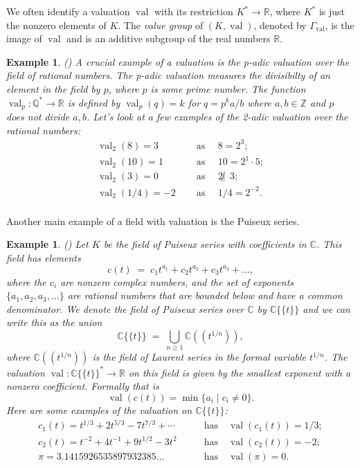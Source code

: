 \documentclass[11pt,reqno,a4paper]{article}
\theoremstyle{theoremstyle}
\theoremstyle{examplestyle}
\newtheorem{example}[theorem]{Example}
\theoremstyle{algorithmstyle}
\numberwithin{equation}{subsection}
\newcommand{\RR}{\mathbb{R}}
\newcommand{\QQ}{\mathbb{Q}}
\newcommand{\CC}{\mathbb{C}}
\newcommand{\puiseux}{\mathbb{C}\{\{t\}\}}
\DeclareMathOperator{\val}{val}
\begin{document}
We often identify a valuation $\val$ with its restriction $K^* \to \RR$, where $K^*$ is just the nonzero elements of $K$. The \textit{value group} of $(K,\val)$, denoted by $\Gamma_{\val}$, is the image of $\val$ and is an additive subgroup of the real numbers $\RR$.

\begin{example}
    (\cite[Ex. 2.1.2]{MS2015}) A crucial example of a valuation is the \textit{p-adic valuation} over the field of rational numbers. The p-adic valuation measures the divisibilty of an element in the field by $p$, where $p$ is some prime number. The function $\val_p:\QQ^*\to \RR$ is defined by $\val_p(q) = k$ for $q=p^k a/b$ where $a,b\in \mathbb{Z}$ and $p$ does not divide $a,b$. Let's look at a few examples of the 2-adic valuation over the rational numbers:
    \begin{align*}        
        \val_2(8) = 3 \quad &\text{ as } \quad 8 = 2^{3}; \\
        \val_2(10) = 1 \quad &\text{ as } \quad 10 = 2^{1}\cdot5; \\
        \val_2(3) = 0 \quad &\text{ as } \quad  2 \not | \ \ 3; \\
        \val_2(1/4) = -2 \quad &\text{ as } \quad  1/4 = 2^{-2}. \\
    \end{align*}
\end{example}

Another main example of a field with valuation is the Puiseux series.

\begin{example}
    (\cite[Ex. 2.1.3]{MS2015}) Let $K$ be the field of \textit{Puiseux series} with coefficients in $\CC$. This field has elements \[c(t) \; = \; c_1t^{a_1} + c_2t^{a_2} + c_3t^{a_3} + \ldots,\] where the $c_i$ are nonzero complex numbers, and the set of exponents\\$\{a_1, a_2, a_3, \ldots\}$ are rational numbers that are bounded below and have a common denominator. We denote the field of Puiseux series over $\CC$ by $\puiseux$ and we can write this as the union \[\puiseux \; = \; \bigcup_{n\geq 1} \CC((t^{1/n})),\] where $\CC((t^{1/n}))$ is the field of Laurent series in the formal variable $t^{1/n}$. The valuation $\val: \puiseux^* \to \RR$ on this field is given by the smallest exponent with a nonzero coefficient. Formally that is \[\val\left(c(t)\right) = \min\{a_i \; | \;  c_i \neq 0\}.\] Here are some examples of the valuation on $\puiseux$: 
    \begin{align*}
        c_1(t) = t^{1/3} +2t^{5/3} -7t^{7/3} + \cdots \quad &\text{has} \quad \val(c_1(t)) = 1/3; \\
        c_2(t) = t^{-2} +4t^{-1} +9t^{1/2} -3t^2 \quad \quad &\text{has} \quad \val(c_2(t)) = -2; \\
        \pi = 3.1415926535897932385\ldots \quad \; &\text{has} \quad \val(\pi) = 0.
    \end{align*}
    
\end{example}
\end{document}
